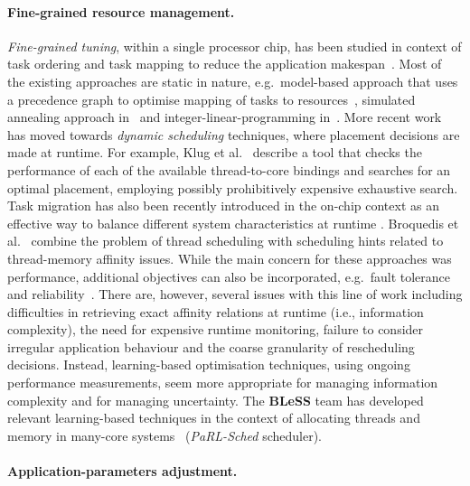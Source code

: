 \documentclass[a4paper,11pt]{article}
\newcommand{\project}[1]{\textbf{#1}\xspace}
\newcommand{\BLESS}{\project{BLeSS}}
\newcommand{\TheProject}{\BLESS}
\begin{document}
\paragraph{Fine-grained resource management.}
\emph{Fine-grained tuning}, within a single processor chip, has been studied in context of task ordering and task mapping to reduce the application makespan~\cite{wang_task_1997}.
Most of the existing approaches are static in nature, e.g.~model-based approach that uses a precedence graph to optimise mapping of tasks to resources~\cite{zhang_joint_2016}, simulated annealing approach in~\cite{marcon_comparison_2008} and integer-linear-programming in~\cite{javaid_design_2009}. More recent work has moved towards \emph{dynamic scheduling} techniques, where placement decisions are made at runtime. For example, Klug et al.~\cite{Klug11} describe a tool that checks the performance of each of the available thread-to-core bindings and searches for an optimal placement, employing possibly prohibitively expensive exhaustive search. Task migration has also been recently introduced in the on-chip context as an effective way to balance different system characteristics at 
runtime \cite{holmbacka_task_2014}. Broquedis et al.~\cite{Broquedis10} combine 
the problem of thread scheduling with scheduling hints related to thread-memory affinity issues. While the main
concern for these approaches was performance, additional objectives can also be
incorporated, e.g.~fault tolerance and 
reliability~\cite{wang_optimizing_2011,matsumoto_investigations_2010,saraswat_task_2009}.
There are, however, several issues with this line of work including difficulties in retrieving exact affinity relations at runtime (i.e., information complexity), the need for expensive runtime monitoring, failure to consider irregular application behaviour and the coarse granularity of rescheduling decisions. Instead, learning-based optimisation techniques, using ongoing performance measurements, seem more appropriate for managing information complexity and for managing uncertainty. The \TheProject{} team has developed relevant learning-based techniques in the context of allocating threads and memory in many-core systems~\cite{chasparis_efficient_2017} (\emph{PaRL-Sched} scheduler). %


\paragraph{Application-parameters adjustment.} 
\end{document}
